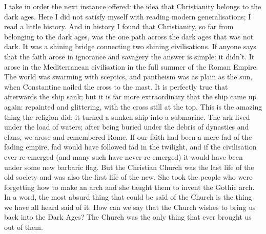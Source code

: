 \documentclass{book}
\begin{document}
I take in order the next instance offered: the idea that Christianity belongs to the dark ages. Here I did not satisfy myself with reading modern generalisations; I read a little history. And in history I found that Christianity, so far from belonging to the dark ages, was the one path across the dark ages that was not dark. It was a shining bridge connecting two shining civilisations. If anyone says that the faith arose in ignorance and savagery the answer is simple: it didn’t. It arose in the Mediterranean civilisation in the full summer of the Roman Empire. The world was swarming with sceptics, and pantheism was as plain as the sun, when Constantine nailed the cross to the mast. It is perfectly true that afterwards the ship sank; but it is far more extraordinary that the ship came up again: repainted and glittering, with the cross still at the top. This is the amazing thing the religion did: it turned a sunken ship into a submarine. The ark lived under the load of waters; after being buried under the debris of dynasties and clans, we arose and remembered Rome. If our faith had been a mere fad of the fading empire, fad would have followed fad in the twilight, and if the civilisation ever re-emerged (and many such have never re-emerged) it would have been under some new barbaric flag. But the Christian Church was the last life of the old society and was also the first life of the new. She took the people who were forgetting how to make an arch and she taught them to invent the Gothic arch. In a word, the most absurd thing that could be said of the Church is the thing we have all heard said of it. How can we say that the Church wishes to bring us back into the Dark Ages? The Church was the only thing that ever brought us out of them.
\end{document}
